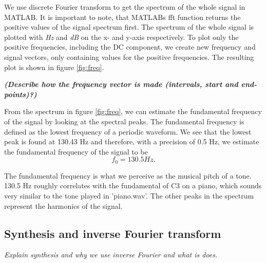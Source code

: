 \documentclass[journal]{IEEEtran}
\begin{document}
We use discrete Fourier transform to get the spectrum of the whole signal in MATLAB. It is important to note, that MATLABs fft function returns the positive values of the signal spectrum first. The spectrum of the whole signal is plotted with \textit{Hz} and \textit{dB} on the x- and y-axis respectively. To plot only the positive frequencies, including the DC component, we create new frequency and signal vectors, only containing values for the positive frequencies. The resulting plot is shown in figure \ref{fig:freq}.

\textbf{\textit{(Describe how the frequency vector is made (intervals, start and end-points)?)}}

\newline
From the spectrum in figure \ref{fig:freq}, we can estimate the fundamental frequency of the signal by looking at the spectral peaks. The fundamental frequency is defined as the lowest frequency of a periodic waveform. %
We see that the lowest peak is found at 130.43 Hz and therefore, with a precision of 0.5 Hz, we estimate the fundamental frequency of the signal to be
\begin{equation}
    f_0 = 130.5 Hz.
\end{equation}

The fundamental frequency is what we perceive as the musical pitch of a tone. 130.5 Hz roughly correlates with the fundamental of C3 on a piano, which sounds very similar to the tone played in 'piano.wav'. The other peaks in the spectrum represent the harmonics of the signal. 

\subsection{Synthesis and inverse Fourier transform}
\textit{Explain synthesis and why we use inverse Fourier and what is does.}


\end{document}
